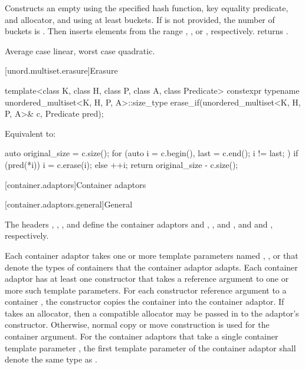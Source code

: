\begin{itemdescr}
\pnum
\effects
Constructs an empty  using the
specified hash function, key equality predicate, and allocator, and
using at least  buckets. If  is not
provided, the number of buckets is . Then
inserts elements from the range , , or ,
respectively.
 returns .

\pnum
\complexity
Average case linear, worst case quadratic.
\end{itemdescr}

[unord.multiset.erasure]{Erasure}

%
\begin{itemdecl}
template<class K, class H, class P, class A, class Predicate>
  constexpr typename unordered_multiset<K, H, P, A>::size_type
    erase_if(unordered_multiset<K, H, P, A>& c, Predicate pred);
\end{itemdecl}

\begin{itemdescr}
\pnum
\effects
Equivalent to:
\begin{codeblock}
auto original_size = c.size();
for (auto i = c.begin(), last = c.end(); i != last; ) {
  if (pred(*i)) {
    i = c.erase(i);
  } else {
    ++i;
  }
}
return original_size - c.size();
\end{codeblock}
\end{itemdescr}

[container.adaptors]{Container adaptors}

[container.adaptors.general]{General}

\pnum
The headers
,
,
,
and 
define the container adaptors
 and ,
,
 and ,
and  and ,
respectively.

\pnum
Each container adaptor takes
one or more template parameters
named , , or 
that denote the types of containers that the container adaptor adapts.
Each container adaptor has at least one constructor
that takes a reference argument to one or more such template parameters.
For each constructor reference argument to a container ,
the constructor copies the container into the container adaptor.
If  takes an allocator, then a compatible allocator may be passed in
to the adaptor's constructor. Otherwise, normal copy or move construction is used for the container
argument.
For the container adaptors
that take a single container template parameter ,
the first template parameter  of the container adaptor
shall denote the same type as .

